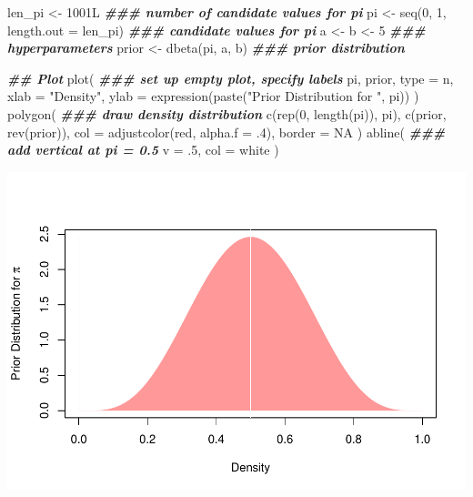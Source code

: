 \documentclass[
  11pt,
]{article}
\newenvironment{Shaded}{\begin{snugshade}}{\end{snugshade}}
\newcommand{\AttributeTok}[1]{\textcolor[rgb]{0.77,0.63,0.00}{#1}}
\newcommand{\ConstantTok}[1]{\textcolor[rgb]{0.00,0.00,0.00}{#1}}
\newcommand{\DecValTok}[1]{\textcolor[rgb]{0.00,0.00,0.81}{#1}}
\newcommand{\DocumentationTok}[1]{\textcolor[rgb]{0.56,0.35,0.01}{\textbf{\textit{#1}}}}
\newcommand{\FunctionTok}[1]{\textcolor[rgb]{0.00,0.00,0.00}{#1}}
\newcommand{\NormalTok}[1]{#1}
\newcommand{\OtherTok}[1]{\textcolor[rgb]{0.56,0.35,0.01}{#1}}
\newcommand{\StringTok}[1]{\textcolor[rgb]{0.31,0.60,0.02}{#1}}
\begin{document}
\begin{Shaded}
\begin{Highlighting}[]
\NormalTok{len\_pi }\OtherTok{\textless{}{-}}\NormalTok{ 1001L                      }\DocumentationTok{\#\#\# number of candidate values for pi}
\NormalTok{pi }\OtherTok{\textless{}{-}} \FunctionTok{seq}\NormalTok{(}\DecValTok{0}\NormalTok{, }\DecValTok{1}\NormalTok{, }\AttributeTok{length.out =}\NormalTok{ len\_pi) }\DocumentationTok{\#\#\# candidate values for pi}
\NormalTok{a }\OtherTok{\textless{}{-}}\NormalTok{ b }\OtherTok{\textless{}{-}} \DecValTok{5}                          \DocumentationTok{\#\#\# hyperparameters}
\NormalTok{prior }\OtherTok{\textless{}{-}} \FunctionTok{dbeta}\NormalTok{(pi, a, b)             }\DocumentationTok{\#\#\# prior distribution}

\DocumentationTok{\#\# Plot}
\FunctionTok{plot}\NormalTok{(                                }\DocumentationTok{\#\#\# set up empty plot, specify labels}
\NormalTok{  pi, prior,}
  \AttributeTok{type =} \StringTok{\textquotesingle{}n\textquotesingle{}}\NormalTok{,}
  \AttributeTok{xlab =} \StringTok{"Density"}\NormalTok{,}
  \AttributeTok{ylab =} \FunctionTok{expression}\NormalTok{(}\FunctionTok{paste}\NormalTok{(}\StringTok{"Prior Distribution for "}\NormalTok{, pi))}
\NormalTok{)}
\FunctionTok{polygon}\NormalTok{(                             }\DocumentationTok{\#\#\# draw density distribution}
  \FunctionTok{c}\NormalTok{(}\FunctionTok{rep}\NormalTok{(}\DecValTok{0}\NormalTok{, }\FunctionTok{length}\NormalTok{(pi)), pi),}
  \FunctionTok{c}\NormalTok{(prior, }\FunctionTok{rev}\NormalTok{(prior)),}
  \AttributeTok{col =} \FunctionTok{adjustcolor}\NormalTok{(}\StringTok{\textquotesingle{}red\textquotesingle{}}\NormalTok{, }\AttributeTok{alpha.f =}\NormalTok{ .}\DecValTok{4}\NormalTok{),}
  \AttributeTok{border =} \ConstantTok{NA}
\NormalTok{)}
\FunctionTok{abline}\NormalTok{(                              }\DocumentationTok{\#\#\# add vertical at pi = 0.5 }
  \AttributeTok{v =}\NormalTok{ .}\DecValTok{5}\NormalTok{,}
  \AttributeTok{col =} \StringTok{\textquotesingle{}white\textquotesingle{}}
\NormalTok{)}
\end{Highlighting}
\end{Shaded}

\begin{center}\includegraphics[width=0.75\linewidth]{03-lec_files/figure-latex/coin-sim0-print-1} \end{center}
\end{document}

